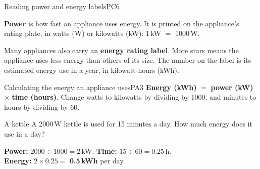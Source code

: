 
\begin{technique}{Reading power and energy labels}{PC6}
\begin{minipage}[c]{0.6\linewidth}
\textbf{Power} is how fast an appliance uses energy. It is printed on the appliance's rating plate, in watts (W) or kilowatts (kW): 1\,kW $=$ 1000\,W.

\smallskip
Many appliances also carry an \textbf{energy rating label}. More stars means the appliance uses less energy than others of its size. The number on the label is its estimated energy use in a year, in kilowatt-hours (kWh).
\end{minipage}\hfill
\begin{minipage}[c]{0.36\linewidth}\centering
{}
\end{minipage}
\end{technique}

\begin{technique}{Calculating the energy an appliance uses}{PA3}
\textbf{Energy (kWh)} $=$ \textbf{power (kW)} $\times$ \textbf{time (hours)}. \quad Change watts to kilowatts by dividing by 1000, and minutes to hours by dividing by 60.
\end{technique}

\begin{workedex}{A kettle}
A 2000\,W kettle is used for 15 minutes a day. How much energy does it use in a day?

\smallskip
\textbf{Power:} $2000 \div 1000 = 2$\,kW. \quad \textbf{Time:} $15 \div 60 = 0.25$\,h.\\
\textbf{Energy:} $2 \times 0.25 = $ \textbf{0.5\,kWh} per day.
\end{workedex}

